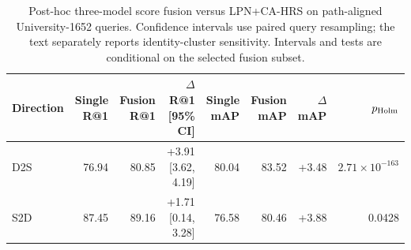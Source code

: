 \begin{table}[!p]
\centering
\small
\caption{Post-hoc three-model score fusion versus LPN+CA-HRS on
path-aligned University-1652 queries. Confidence intervals use paired query
resampling; the text separately reports identity-cluster sensitivity.
Intervals and tests are conditional on the selected fusion subset.}
\label{tab:formal-best-fusion}
\begin{tabular}{lrrrrrrr}
\toprule
Direction & Single R@1 & Fusion R@1 & $\Delta$R@1 [95\% CI]
& Single mAP & Fusion mAP & $\Delta$mAP & $p_{\rm Holm}$ \\
\midrule
D2S & 76.94 & 80.85 & +3.91 [3.62, 4.19]
    & 80.04 & 83.52 & +3.48 & $2.71{\times}10^{-163}$ \\
S2D & 87.45 & 89.16 & +1.71 [0.14, 3.28]
    & 76.58 & 80.46 & +3.88 & 0.0428 \\
\bottomrule
\end{tabular}
\end{table}
